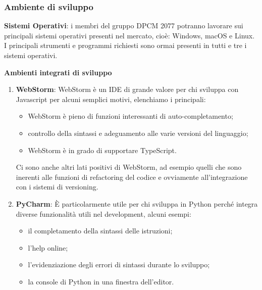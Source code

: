 \subsubsection{Ambiente di sviluppo}
\begin{description}
\item{\textbf{Sistemi Operativi}}: i membri del gruppo DPCM 2077 potranno lavorare sui principali sistemi operativi presenti nel mercato, cioè: Windows, macOS e Linux.
I principali strumenti e programmi richiesti sono ormai presenti in tutti e tre i sistemi operativi.
\item{\textbf{Ambienti integrati di sviluppo}}
\begin{enumerate}
\item{\textbf{WebStorm}}: WebStorm è un IDE di grande valore per chi sviluppa con Javascript per alcuni semplici motivi, elenchiamo i principali:
\begin{itemize}
\item WebStorm è pieno di funzioni interessanti di auto-completamento;
\item controllo della sintassi e adeguamento alle varie versioni del linguaggio;
\item WebStorm è in grado di supportare TypeScript.
\end{itemize}
Ci sono anche altri lati positivi di WebStorm, ad esempio quelli che sono inerenti alle funzioni di refactoring del codice e ovviamente all’integrazione con i sistemi di versioning.
\item{\textbf{PyCharm}}: È particolarmente utile per chi sviluppa in Python perché integra diverse funzionalità utili nel development, alcuni esempi:
\begin{itemize}
\item il completamento della sintassi delle istruzioni;
\item l'help online;
\item l'evidenziazione degli errori di sintassi durante lo sviluppo;
\item la console di Python in una finestra dell'editor.
\end{itemize}
\end{enumerate}
\end{description}


